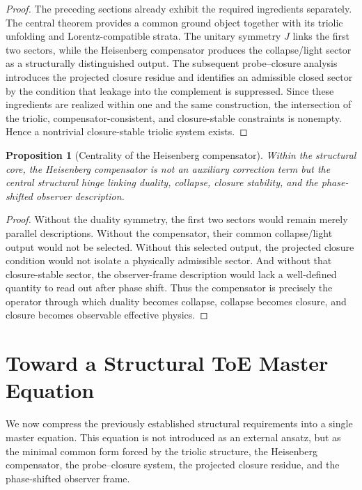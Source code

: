 \documentclass[12pt,a4paper]{article}
\newtheorem{proposition}[theorem]{Proposition}
\begin{document}
\begin{proof}
The preceding sections already exhibit the required ingredients separately.
The central theorem provides a common ground object together with its triolic
unfolding and Lorentz-compatible strata. The unitary symmetry $J$ links the
first two sectors, while the Heisenberg compensator produces the
collapse/light sector as a structurally distinguished output. The subsequent
probe--closure analysis introduces the projected closure residue and identifies
an admissible closed sector by the condition that leakage into the complement
is suppressed. Since these ingredients are realized within one and the same
construction, the intersection of the triolic, compensator-consistent, and
closure-stable constraints is nonempty. Hence a nontrivial closure-stable
triolic system exists.
\end{proof}

\begin{proposition}[Centrality of the Heisenberg compensator]
\label{prop:hc-centrality}
Within the structural core, the Heisenberg compensator is not an auxiliary
correction term but the central structural hinge linking duality, collapse,
closure stability, and the phase-shifted observer description.
\end{proposition}

\begin{proof}
Without the duality symmetry, the first two sectors would remain merely
parallel descriptions. Without the compensator, their common collapse/light
output would not be selected. Without this selected output, the projected
closure condition would not isolate a physically admissible sector. And
without that closure-stable sector, the observer-frame description would lack a
well-defined quantity to read out after phase shift. Thus the compensator is
precisely the operator through which duality becomes collapse, collapse becomes
closure, and closure becomes observable effective physics.
\end{proof}

\section{Toward a Structural ToE Master Equation}
\label{sec:toe-master}

We now compress the previously established structural requirements into a
single master equation. This equation is not introduced as an external ansatz,
but as the minimal common form forced by the triolic structure, the
Heisenberg compensator, the probe--closure system, the projected closure
residue, and the phase-shifted observer frame.
\end{document}
